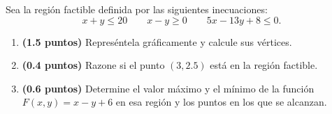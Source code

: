
Sea la región factible definida por las siguientes inecuaciones:
\[
x+y\leq 20\qquad x-y\geq 0\qquad 5x-13y+8\leq 0.
\]
\begin{enumerate}[label=\alph*)]
\item \textbf{(1.5 puntos)} Represéntela gráficamente y calcule sus vértices.
\item \textbf{(0.4 puntos)} Razone si el punto $(3,2.5)$ está en la región factible.
\item \textbf{(0.6 puntos)} Determine el valor máximo y el mínimo de la función $F(x,y)=x-y+6$ en esa región y los puntos en los que se alcanzan.
\end{enumerate}
